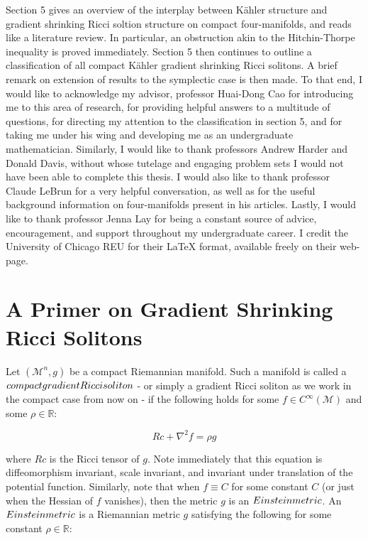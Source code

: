 \documentclass[openany, amssymb, psamsfonts]{amsart}
\theoremstyle{definition}
\numberwithin{equation}{section}
\begin{document}
    Section 5 gives an overview of the interplay between Kähler structure and gradient shrinking Ricci soltion structure on compact four-manifolds, and reads like a literature review. In particular, an obstruction akin to the Hitchin-Thorpe inequality is proved immediately. Section 5 then continues to outline a classification of all compact Kähler gradient shrinking Ricci solitons. A brief remark on extension of results to the symplectic case is then made. To that end, I would like to acknowledge my advisor, professor Huai-Dong Cao for introducing me to this area of research, for providing helpful answers to a multitude of questions, for directing my attention to the classification in section 5, and for taking me under his wing and developing me as an undergraduate mathematician. Similarly, I would like to thank professors Andrew Harder and Donald Davis, without whose tutelage and engaging problem sets I would not have been able to complete this thesis. I would also like to thank professor Claude LeBrun for a very helpful conversation, as well as for the useful background information on four-manifolds present in his articles. Lastly, I would like to thank professor Jenna Lay for being a constant source of advice, encouragement, and support throughout my undergraduate career. I credit the University of Chicago REU for their LaTeX format, available freely on their web-page. 
    
    

\section{A Primer on Gradient Shrinking Ricci Solitons}

 Let $(\mathcal{M}^n, g)$ be a compact Riemannian manifold. Such a manifold is called a $\emph{compact gradient Ricci soliton}$ - or simply a gradient Ricci soliton as we work in the compact case from now on -  if the following holds for some $f \in C^\infty(\mathcal{M})$ and some $\rho \in \mathbb{R}$:

 $$Rc + \nabla^2f = \rho g$$

 where $Rc$ is the Ricci tensor of $g$. Note immediately that this equation is diffeomorphism invariant, scale invariant, and invariant under translation of the potential function. Similarly, note that when $f \equiv C$ for some constant $C$ (or just when the Hessian of $f$ vanishes), then the metric $g$ is an $\emph{Einstein metric}$. An $\emph{Einstein metric}$ is a Riemannian metric $g$ satisfying the following for some constant $\rho \in \mathbb{R}$: 
 
\end{document}

